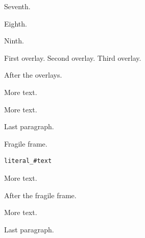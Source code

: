\documentclass{beamer}
\begin{document}


\begin{frame}
Seventh. %

Eighth.

Ninth.
\end{frame}

\begin{frame}
First overlay.
\pause
Second overlay.
\pause
Third overlay.
\end{frame}

\begin{frame}
After the overlays. %

More text.

More text.

Last paragraph.
\end{frame}

\begin{frame}[fragile]
Fragile frame. %

\begin{verbatim}
literal_#text
\end{verbatim}

More text.
\end{frame}

\begin{frame}
After the fragile frame. %

More text.

Last paragraph.
\end{frame}
\end{document}
